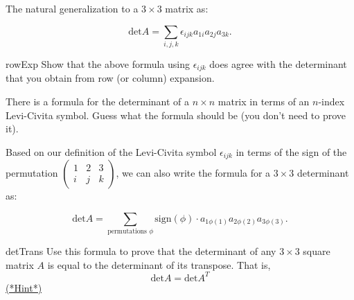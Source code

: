 The natural generalization to a $3 \times 3$ matrix as:

\[ \text{det} A = \sum_{i,j,k} \epsilon_{ijk} a_{1i} a_{2j} a_{3k}. \]

\noindent

\begin{exercise}{rowExp}
Show that the above formula using $\epsilon_{ijk}$ does agree with the determinant that you obtain from row (or column)  expansion.
\end{exercise}

\begin{exercise}{}
There is a formula for the determinant of a $n \times n$  matrix in terms of an $n$-index Levi-Civita symbol. Guess what the formula should be (you don't need to prove it).
\end{exercise}


Based on our definition of the Levi-Civita symbol $\epsilon_{ijk}$ in terms of the sign of the permutation $ \left( \begin{smallmatrix}  1 & 2 & 3  \\ i & j & k  \end{smallmatrix} \right)$, we can also write the formula for a $3 \times 3$ determinant as:

\[ \text{det} A = \sum_{\text{permutations } \phi} \text{sign}(\phi) \cdot a_{1\phi(1)} a_{2\phi(2)} a_{3\phi(3)}. \]

\begin{exercise}{detTrans}
Use this formula to prove that the determinant of any $3 \times 3$ square matrix $A$ is equal to the determinant of its transpose.  That is, 
\[ \text{det} A = \text{det}A^{T} \]
\hyperref[sec:sigma:hints]{(*Hint*)} 
\end{exercise}

